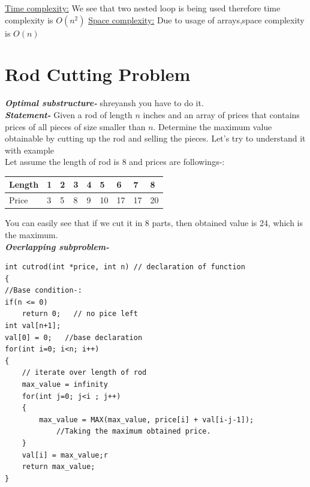 \documentclass[12pt]{book}
\begin{document}
\underline{Time complexity:}\newline
We see that two nested loop is being used therefore time complexity is $O(n^2)$\newline\newline
\underline{Space complexity:}\newline
Due to usage of arrays,space complexity is $O(n)$\newline

\chapter{Rod Cutting Problem}

\textbf{\textit{Optimal substructure-}} shreyansh you have to do it.\\

\textbf{\textit{Statement-}}
Given a rod of length $n$ inches and an array of prices that contains prices of all pieces of size smaller than $n$. Determine the maximum value obtainable by cutting up the rod and selling the pieces.
Let’s try to understand it with example \\

Let assume the length of rod is 8 and prices are followings-:\\

\begin{center}
\begin{tabular}{ | m{1.5cm} | m{1cm}| m{1cm} | m{1cm} | m{1cm} | m{1cm} | m{1cm} | m{1cm} | m{1cm} | } 
\hline
Length & 1 & 2 & 3 & 4 & 5 & 6 & 7 & 8  \\ 
\hline
Price & 3 & 5 & 8 & 9 & 10 & 17 & 17 & 20  \\
\hline
\end{tabular}
\end{center}


You can easily see that if we cut it in 8 parts, then obtained value is 24, which is the maximum.\\

\textbf{\textit{Overlapping subproblem-}}\\

\begin{lstlisting}
int cutrod(int *price, int n) // declaration of function
{
//Base condition-:
if(n <= 0)
    return 0;   // no pice left
int val[n+1];
val[0] = 0;   //base declaration
for(int i=0; i<n; i++)
{
    // iterate over length of rod
    max_value = infinity
    for(int j=0; j<i ; j++)
    {
        max_value = MAX(max_value, price[i] + val[i-j-1]);
            //Taking the maximum obtained price.
    }
    val[i] = max_value;r
    return max_value;
}
\end{lstlisting}
\end{document}
